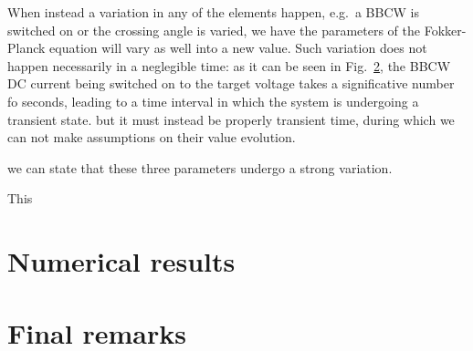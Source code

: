 When instead a variation in any of the elements happen, e.g.\ a BBCW is switched on or the crossing angle is varied, we have the parameters of the Fokker-Planck equation will vary as well into a new value. Such variation does not happen necessarily in a neglegible time: as it can be seen in Fig.~\ref{}, the BBCW DC current being switched on to the target voltage takes a significative number fo seconds, leading to a time interval in which the system is undergoing a transient state. but it must instead be properly transient time, during which we can not make assumptions on their value evolution.

we can state that these three parameters undergo a strong variation.

This

\section{Numerical results}

\section{Final remarks}